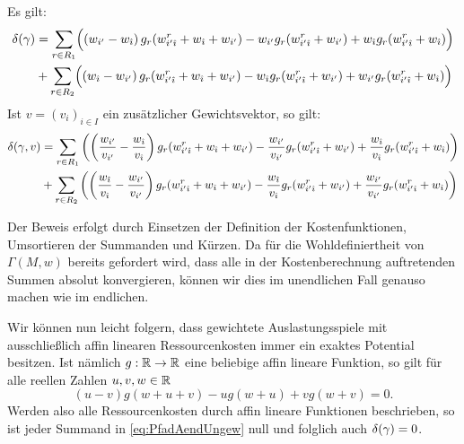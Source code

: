 \begin{lemma}\label{lemma:PfadAenderungen}
	Es gilt:
		\begin{align}\begin{split}  \label{eq:PfadAendUngew}
			\delta(\gamma) &= \sum_{r \in R_1} \Bigl(\left(w_{i'} - w_{\hat{\imath}}\right) g_r({w^r_{{i'}{\hat{\imath}}}} + w_{\hat{\imath}} + w_{i'}) - w_{i'} g_r({w^r_{{i'}{\hat{\imath}}}} + w_{i'})  + w_{\hat{\imath}} g_r({w^r_{{i'}{\hat{\imath}}}} + w_{\hat{\imath}})\Bigr) \\
			&+ \sum_{r \in R_2} \Bigl(\left(w_{\hat{\imath}} - w_{i'}\right) g_r({w^r_{{i'}{\hat{\imath}}}} + w_{\hat{\imath}} + w_{i'}) - w_{\hat{\imath}} g_r({w^r_{{i'}{\hat{\imath}}}} + w_{i'}) + w_{i'} g_r({w^r_{{i'}{\hat{\imath}}}} + w_{\hat{\imath}})\Bigr)
		\end{split}\end{align}
	Ist $v = (v_i)_{i \in I}$ ein zusätzlicher Gewichtsvektor, so gilt:
		\begin{align}\begin{split}\label{eq:PfadAendGew}
			\delta(\gamma, v) &= \sum_{r \in R_1} \left(\left(\frac{w_{i'}}{v_{i'}} - \frac{w_{\hat{\imath}}}{v_{\hat{\imath}}}\right) g_r({w^r_{{i'}{\hat{\imath}}}} + w_{\hat{\imath}} + w_{i'}) - \frac{w_{i'}}{v_{i'}} g_r({w^r_{{i'}{\hat{\imath}}}} + w_{i'})  + \frac{w_{\hat{\imath}}}{v_{\hat{\imath}}} g_r({w^r_{{i'}{\hat{\imath}}}} + w_{\hat{\imath}})\right) \\
								&+ \sum_{r \in R_2} \left(\left(\frac{w_{\hat{\imath}}}{v_{\hat{\imath}}} - \frac{w_{i'}}{v_{i'}}\right) g_r({w^r_{{i'}{\hat{\imath}}}} + w_{\hat{\imath}} + w_{i'}) - \frac{w_{\hat{\imath}}}{v_{\hat{\imath}}} g_r({w^r_{{i'}{\hat{\imath}}}} + w_{i'}) + \frac{w_{i'}}{v_{i'}} g_r({w^r_{{i'}{\hat{\imath}}}} + w_{\hat{\imath}})\right)
		\end{split}\end{align}
\end{lemma}

Der Beweis erfolgt durch Einsetzen der Definition der Kostenfunktionen, Umsortieren der Summanden und Kürzen. Da für die Wohldefiniertheit von $\Gamma(M, w)$ bereits gefordert wird, dass alle in der Kostenberechnung auftretenden Summen absolut konvergieren, können wir dies im unendlichen Fall genauso machen wie im endlichen.

Wir können nun leicht folgern, dass gewichtete Auslastungsspiele mit ausschließlich affin linearen Ressourcenkosten immer ein exaktes Potential besitzen. Ist nämlich $g: \mathbb{R}\to \mathbb{R}$ eine beliebige affin lineare Funktion, so gilt für alle reellen Zahlen $u,v,w \in \mathbb{R}$
	\[(u-v)g(w+u+v) - u g(w+u) + v g(w+v) = 0.\]
Werden also alle Ressourcenkosten durch affin lineare Funktionen beschrieben, so ist jeder Summand in \eqref{eq:PfadAendUngew} null und folglich auch $\delta(\gamma) = 0$.

